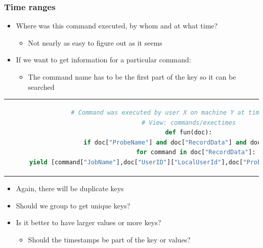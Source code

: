 \documentclass{beamer}
\begin{document}
\begin{frame}[t, fragile]
\frametitle{Time ranges}
\begin{itemize}
\item Where was this command executed, by whom and at what time?
\begin{itemize}
	\item Not nearly as easy to figure out as it seems
\end{itemize}
\item If we want to get information for a particular command:
\begin{itemize}
	\item The command name has to be the first part of the key so it can be searched
\end{itemize}
\end{itemize}
{ \tiny
\begin{center}
\begin{tabular}{c}
\begin{lstlisting}[language=Python]
# Command was executed by user X on machine Y at time Z (records)
# View: commands/exectimes
def fun(doc):
  if doc["ProbeName"] and doc["RecordData"] and doc["UserID"]:
    for command in doc["RecordData"]:
      yield [command["JobName"],doc["UserID"]["LocalUserId"],doc["ProbeName"], command["StartTime"]]
\end{lstlisting}
\end{tabular}
\end{center}
}
\begin{itemize}
 \item Again, there will be duplicate keys
 \item Should we group to get unique keys?
 \item Is it better to have larger values or more keys?
\begin{itemize}
	\item Should the timestamps be part of the key or values?
\end{itemize}
\end{itemize}
\end{frame}
\end{document}
